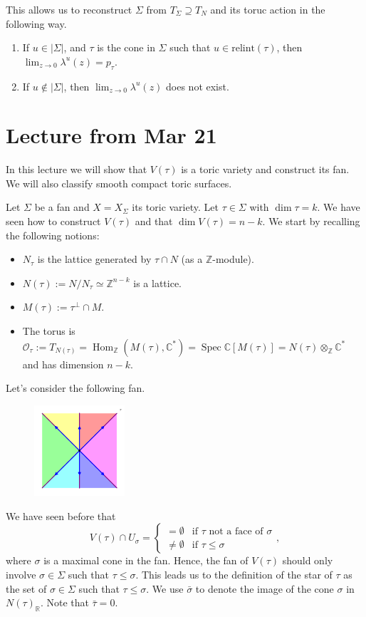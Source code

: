 \documentclass[a4paper,12pt]{amsart}
\newcommand{\ZZ}{\mathbb{Z}}
\newcommand{\RR}{\mathbb{R}}
\newcommand{\CC}{\mathbb{C}}
\newcommand{\OO}{\ensuremath{\mathcal{O}}}
\DeclareMathOperator{\Hom}{Hom}
\DeclareMathOperator{\Spec}{Spec}
\begin{document}
This allows us to reconstruct $\Sigma$ from $T_\Sigma\supseteq T_N$ and its toruc action in the following way.
\begin{enumerate}[(1)]
	\item If $u\in|\Sigma|$, and $\tau$ is the cone in $\Sigma$ such that $u\in\text{relint}(\tau)$, then $\lim_{z\rightarrow0}\lambda^u(z)=p_\tau$.
	\item If $u\not\in|\Sigma|$, then $\lim_{z\rightarrow0}\lambda^u(z)$ does not exist.
\end{enumerate}

\newpage
\section{Lecture from Mar 21}

In this lecture we will show that $V(\tau)$ is a toric variety and construct its fan. We will also classify smooth compact toric surfaces.

Let $\Sigma$ be a fan and $X=X_\Sigma$ its toric variety. Let $\tau\in\Sigma$ with $\dim\tau=k$. We have seen how to construct $V(\tau)$ and that $\dim V(\tau)=n-k$. We start by recalling the following notions:
\begin{itemize}
	\item $N_\tau$ is the lattice generated by $\tau\cap N$ (as a $\ZZ$-module).
	\item $N(\tau):=N/N_\tau\simeq\ZZ^{n-k}$ is a lattice.
	\item $M(\tau):=\tau^\perp\cap M$.
	\item The torus is $\OO_\tau:=T_{N(\tau)}=\Hom_\ZZ(M(\tau),\CC^*)=\Spec\CC[M(\tau)]=N(\tau)\otimes_\ZZ\CC^*$ and has dimension $n-k$.
\end{itemize}

\begin{example}
	Let's consider the following fan.
	
	\begin{figure}[h]
		\centering
		\includegraphics[width=0.3\textwidth]{pic/Mar21_fan0}
	\end{figure}
	
	We have seen before that
	$$V(\tau)\cap U_\sigma=\begin{cases}
	=\emptyset&\text{if }\tau\text{ not a face of }\sigma\\
	\not=\emptyset &\text{if }\tau\leq\sigma
	\end{cases},$$
	where $\sigma$ is a maximal cone in the fan. Hence, the fan of $V(\tau)$ should only involve $\sigma\in\Sigma$ such that $\tau\leq\sigma$. This leads us to the definition of the star of $\tau$ as the set of $\sigma\in\Sigma$ such that $\tau\leq\sigma$. We use $\bar{\sigma}$ to denote the image of the cone $\sigma$ in $N(\tau)_\RR$. Note that $\bar{\tau}=0$.
\end{example}
\end{document}
